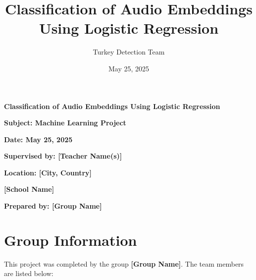 \documentclass[12pt, a4paper]{article}
\title{Classification of Audio Embeddings Using Logistic Regression}
\author{Turkey Detection Team}
\date{May 25, 2025}
\begin{document}
\begin{titlepage}
    \centering
    \vspace*{2cm}
    

    \vspace{1.5cm}
    
    \Huge \textbf{Classification of Audio Embeddings Using Logistic Regression} \\
    
    \vspace{1cm}
    
    \Large \textbf{Subject: Machine Learning Project} \\
    
    \vspace{0.5cm}
    
    \large \textbf{Date: May 25, 2025} \\
    
    \vspace{0.5cm}
    
    \large \textbf{Supervised by: [Teacher Name(s)]} \\
    
    \vspace{0.5cm}
    
    \large \textbf{Location: [City, Country]} \\
    
    \vspace{0.5cm}
    
    \large \textbf{[School Name]} \\
    
    \vspace{2cm}
    
    \large \textbf{Prepared by: [Group Name]} \\
    
    \vfill
    
\end{titlepage}

\newpage

\section{Group Information}
This project was completed by the group \textbf{[Group Name]}. The team members are listed below:
\end{document}
